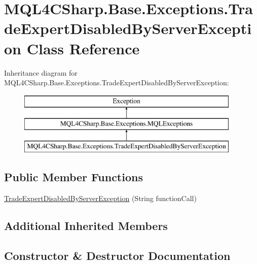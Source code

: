 \hypertarget{class_m_q_l4_c_sharp_1_1_base_1_1_exceptions_1_1_trade_expert_disabled_by_server_exception}{}\section{M\+Q\+L4\+C\+Sharp.\+Base.\+Exceptions.\+Trade\+Expert\+Disabled\+By\+Server\+Exception Class Reference}
\label{class_m_q_l4_c_sharp_1_1_base_1_1_exceptions_1_1_trade_expert_disabled_by_server_exception}
Inheritance diagram for M\+Q\+L4\+C\+Sharp.\+Base.\+Exceptions.\+Trade\+Expert\+Disabled\+By\+Server\+Exception\+:\begin{figure}[H]
\begin{center}
\leavevmode
\includegraphics[height=3.000000cm]{class_m_q_l4_c_sharp_1_1_base_1_1_exceptions_1_1_trade_expert_disabled_by_server_exception}
\end{center}
\end{figure}
\subsection*{Public Member Functions}
\begin{DoxyCompactItemize}
\item 
\hyperlink{class_m_q_l4_c_sharp_1_1_base_1_1_exceptions_1_1_trade_expert_disabled_by_server_exception_ad3f5a92a2516be128245adfe24f48e23}{Trade\+Expert\+Disabled\+By\+Server\+Exception} (String function\+Call)
\end{DoxyCompactItemize}
\subsection*{Additional Inherited Members}


\subsection{Constructor \& Destructor Documentation}
